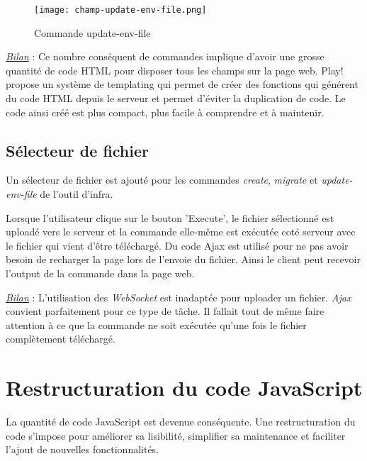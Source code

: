 \begin{figure}[H]
  \begin{center}
    \texttt{[image: champ-update-env-file.png]} 
  \end{center}
  \caption{Commande update-env-file} 
\end{figure}

\underline{\textit{Bilan}} : Ce nombre conséquent de commandes implique d'avoir
une grosse quantité de code HTML pour disposer tous les champs sur la
page web. Play! propose un système de templating qui permet de créer des
fonctions qui générent du code HTML depuis le serveur et permet d'éviter la
duplication de code. Le code ainsi créé est plus compact, plus facile à
comprendre et à maintenir.

\subsection{Sélecteur de fichier}

Un sélecteur de fichier est ajouté pour les commandes \textit{create},
\textit{migrate} et \textit{update-env-file} de l'outil d'infra.

Lorsque l'utilisateur clique sur le bouton 'Execute', le fichier sélectionné est
uploadé vers le serveur et la commande elle-même est exécutée coté serveur avec
le fichier qui vient d'être téléchargé.
Du code Ajax est utilisé pour ne pas avoir besoin de recharger la page lors de
l'envoie du fichier.
Ainsi le client peut recevoir l'output de la commande dans la page web.

\underline{\textit{Bilan}} : L'utilisation des \textit{WebSocket} est inadaptée
pour uploader un fichier. \textit{Ajax} convient parfaitement pour ce type de
tâche. Il fallait tout de même faire attention à ce que la commande ne soit
exécutée qu'une fois le fichier complètement téléchargé.

\section{Restructuration du code JavaScript}

La quantité de code JavaScript est devenue conséquente. Une restructuration du
code s'impose pour améliorer sa lisibilité, simplifier sa maintenance et
faciliter l'ajout de nouvelles fonctionnalités.



